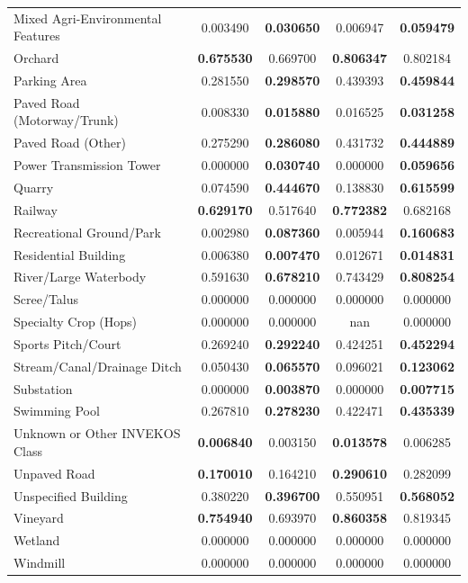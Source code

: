 \documentclass{report}
\begin{document}
\begin{table}[H]
\begin{adjustwidth}{-2cm}{}
\begin{tabular}{l S[table-format=1.6, detect-weight] S[table-format=1.6, detect-weight] | S[table-format=1.6, detect-weight] S[table-format=1.6, detect-weight]}
Mixed Agri-Environmental Features & 0.003490 & \textbf{0.030650} & 0.006947 & \textbf{0.059479} \\
Orchard & \textbf{0.675530} & 0.669700 & \textbf{0.806347} & 0.802184 \\
Parking Area & 0.281550 & \textbf{0.298570} & 0.439393 & \textbf{0.459844} \\
Paved Road (Motorway/Trunk) & 0.008330 & \textbf{0.015880} & 0.016525 & \textbf{0.031258} \\
Paved Road (Other) & 0.275290 & \textbf{0.286080} & 0.431732 & \textbf{0.444889} \\
Power Transmission Tower & 0.000000 & \textbf{0.030740} & 0.000000 & \textbf{0.059656} \\
Quarry & 0.074590 & \textbf{0.444670} & 0.138830 & \textbf{0.615599} \\
Railway & \textbf{0.629170} & 0.517640 & \textbf{0.772382} & 0.682168 \\
Recreational Ground/Park & 0.002980 & \textbf{0.087360} & 0.005944 & \textbf{0.160683} \\
Residential Building & 0.006380 & \textbf{0.007470} & 0.012671 & \textbf{0.014831} \\
River/Large Waterbody & 0.591630 & \textbf{0.678210} & 0.743429 & \textbf{0.808254} \\
Scree/Talus & 0.000000 & 0.000000 & 0.000000 & 0.000000 \\
Specialty Crop (Hops) & 0.000000 & 0.000000 & {nan} & 0.000000 \\
Sports Pitch/Court & 0.269240 & \textbf{0.292240} & 0.424251 & \textbf{0.452294} \\
Stream/Canal/Drainage Ditch & 0.050430 & \textbf{0.065570} & 0.096021 & \textbf{0.123062} \\
Substation & 0.000000 & \textbf{0.003870} & 0.000000 & \textbf{0.007715} \\
Swimming Pool & 0.267810 & \textbf{0.278230} & 0.422471 & \textbf{0.435339} \\
Unknown or Other INVEKOS Class & \textbf{0.006840} & 0.003150 & \textbf{0.013578} & 0.006285 \\
Unpaved Road & \textbf{0.170010} & 0.164210 & \textbf{0.290610} & 0.282099 \\
Unspecified Building & 0.380220 & \textbf{0.396700} & 0.550951 & \textbf{0.568052} \\
Vineyard & \textbf{0.754940} & 0.693970 & \textbf{0.860358} & 0.819345 \\
Wetland & 0.000000 & 0.000000 & 0.000000 & 0.000000 \\
Windmill & 0.000000 & 0.000000 & 0.000000 & 0.000000 \\
\bottomrule
\end{tabular}
\end{adjustwidth}
\end{table}
\end{document}
